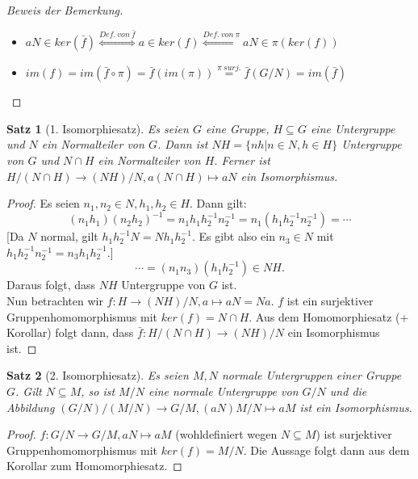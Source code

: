 \documentclass[12pt]{scrartcl}%
\newtheorem{thm}{Satz}
\theoremstyle{definition}
\theoremstyle{remark}
\begin{document}
\begin{proof}[Beweis der Bemerkung]
	\begin{itemize}
		\item $aN \in ker(\bar{f}) \stackrel{Def. ~ von ~ \bar{f}}{\Leftrightarrow} a \in ker(f)\stackrel{Def. ~ von ~ \pi}{\Leftrightarrow} aN \in \pi(ker(f))$
		\item $im(f) = im(\bar{f} \circ \pi) = \bar{f}(im(\pi)) \stackrel{\pi ~ surj.}{=} \bar{f}(G/N) = im(\bar{f})$
	\end{itemize}
\end{proof}

\begin{thm}[1. Isomorphiesatz]
	Es seien $G$ eine Gruppe, $H \subseteq G$ eine Untergruppe und $N$ ein Normalteiler von $G$. Dann ist $NH = \{nh | n \in N, h \in H\}$ Untergruppe von $G$ und $N \cap H$ ein Normalteiler von $H$. Ferner ist $H/(N \cap H) \rightarrow (NH)/N, a(N \cap H) \mapsto aN$ ein Isomorphismus.
\end{thm}

\begin{proof}
	Es seien $n_1, n_2 \in N, h_1, h_2 \in H$. Dann gilt:
	$$ (n_1h_1)(n_2h_2)^{-1} = n_1h_1h_2^{-1}n_2^{-1} = n_1(h_1h_2^{-1}n_2^{-1}) = \dotsb $$
	[Da $N$ normal, gilt $h_1h_2^{-1}N = Nh_1h_2^{-1}$. Es gibt also ein $n_3 \in N$ mit $h_1h_2^{-1}n_2^{-1} = n_3h_1h_2^{-1}$.]
	$$ \dotsb = (n_1n_3)(h_1h_2^{-1}) \in NH.$$
	Daraus folgt, dass $NH$ Untergruppe von $G$ ist. \\
	Nun betrachten wir $f: H \rightarrow (NH)/N, a \mapsto aN = Na$. $f$ ist ein surjektiver Gruppenhomomorphismus mit $ker(f) = N \cap H$. Aus dem Homomorphiesatz (+ Korollar) folgt dann, dass $\bar{f}: H/(N \cap H) \rightarrow (NH)/N$ ein Isomorphismus ist.
\end{proof}

\begin{thm}[2. Isomorphiesatz]
	Es seien $M, N$ normale Untergruppen einer Gruppe $G$. Gilt $N \subseteq M$, so ist $M/N$ eine normale Untergruppe von $G/N$ und die Abbildung $(G/N)/(M/N) \rightarrow G/M, (aN)M/N \mapsto aM$ ist ein Isomorphismus.
\end{thm}

\begin{proof}
	$f: G/N \rightarrow G/M, aN \mapsto aM$ (wohldefiniert wegen $N \subseteq M$) ist surjektiver Gruppenhomomorphismus mit $ker(f) = M/N$. Die Aussage folgt dann aus dem Korollar zum Homomorphiesatz.
\end{proof}
\end{document}
